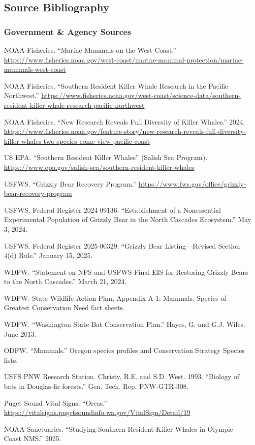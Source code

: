 \documentclass[11pt,letterpaper]{article}
\begin{document}
\subsection{Source Bibliography}

\subsubsection{Government \& Agency Sources}
\begin{enumerate}[leftmargin=2em, label={[G\arabic*]}]
\item NOAA Fisheries. ``Marine Mammals on the West Coast.'' \url{https://www.fisheries.noaa.gov/west-coast/marine-mammal-protection/marine-mammals-west-coast}
\item NOAA Fisheries. ``Southern Resident Killer Whale Research in the Pacific Northwest.'' \url{https://www.fisheries.noaa.gov/west-coast/science-data/southern-resident-killer-whale-research-pacific-northwest}
\item NOAA Fisheries. ``New Research Reveals Full Diversity of Killer Whales.'' 2024. \url{https://www.fisheries.noaa.gov/feature-story/new-research-reveals-full-diversity-killer-whales-two-species-come-view-pacific-coast}
\item US EPA. ``Southern Resident Killer Whales'' (Salish Sea Program). \url{https://www.epa.gov/salish-sea/southern-resident-killer-whales}
\item USFWS. ``Grizzly Bear Recovery Program.'' \url{https://www.fws.gov/office/grizzly-bear-recovery-program}
\item USFWS. Federal Register 2024-09136: ``Establishment of a Nonessential Experimental Population of Grizzly Bear in the North Cascades Ecosystem.'' May 3, 2024.
\item USFWS. Federal Register 2025-00329: ``Grizzly Bear Listing---Revised Section 4(d) Rule.'' January 15, 2025.
\item WDFW. ``Statement on NPS and USFWS Final EIS for Restoring Grizzly Bears to the North Cascades.'' March 21, 2024.
\item WDFW. State Wildlife Action Plan, Appendix A-1: Mammals. Species of Greatest Conservation Need fact sheets.
\item WDFW. ``Washington State Bat Conservation Plan.'' Hayes, G. and G.J. Wiles. June 2013.
\item ODFW. ``Mammals.'' Oregon species profiles and Conservation Strategy Species lists.
\item USFS PNW Research Station. Christy, R.E. and S.D. West. 1993. ``Biology of bats in Douglas-fir forests.'' Gen. Tech. Rep. PNW-GTR-308.
\item Puget Sound Vital Signs. ``Orcas.'' \url{https://vitalsigns.pugetsoundinfo.wa.gov/VitalSign/Detail/19}
\item NOAA Sanctuaries. ``Studying Southern Resident Killer Whales in Olympic Coast NMS.'' 2025.
\end{enumerate}
\end{document}
